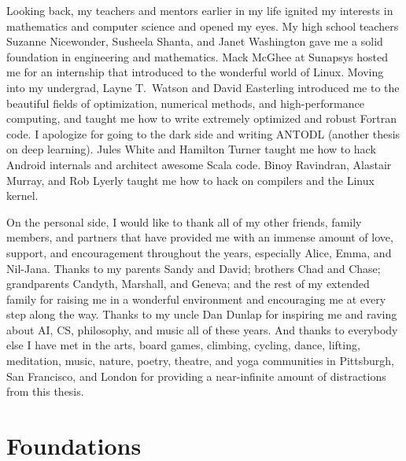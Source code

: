 \documentclass[12pt]{cmuthesis}
\begin{document}
\begin{acknowledgments}
  Looking back, my teachers and mentors earlier in my life
  ignited my interests in mathematics and computer science
  and opened my eyes.
  My high school teachers
  Suzanne Nicewonder,
  Susheela Shanta, and
  Janet Washington gave me a solid foundation
  in engineering and mathematics.
  Mack McGhee at Sunapsys hosted me for an
  internship that introduced to the wonderful
  world of Linux.
  Moving into my undergrad,
  Layne T.~Watson and David Easterling
  introduced me to the beautiful fields
  of optimization, numerical methods, and
  high-performance computing, and taught me how to
  write extremely optimized and robust Fortran code.
  I apologize for going to the dark side and writing
  ANTODL (another thesis on deep learning).
  Jules White and Hamilton Turner taught me how
  to hack Android internals and architect awesome Scala code.
  Binoy Ravindran, Alastair Murray, and Rob Lyerly
  taught me how to hack on compilers
  and the Linux kernel.

  On the personal side, I would like to thank all of my
  other friends, family members, and partners that
  have provided me with an immense amount of love,
  support, and encouragement throughout the years,
  especially Alice, Emma, and Nil-Jana.
  Thanks to my parents Sandy and David;
  brothers Chad and Chase;
  grandparents Candyth, Marshall, and Geneva;
  and the rest of my extended family
  for raising me in a wonderful environment and
  encouraging me at every step along the way.
  Thanks to my uncle Dan Dunlap for inspiring me and
  raving about AI, CS, philosophy, and music all of these years.
  And thanks to everybody else I have met in the
  arts,
  board games,
  climbing,
  cycling,
  dance,
  lifting,
  meditation,
  music,
  nature,
  poetry,
  theatre, and
  yoga
  communities in Pittsburgh, San Francisco, and London for
  providing a near-infinite amount of distractions from
  this thesis.
\end{acknowledgments}

\pagestyle{plain}

\tableofcontents
\listoffigures
\listoftables
\listofalgorithms

\mainmatter




\part{Foundations}


\end{document}
